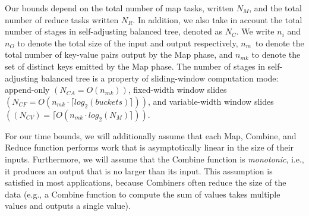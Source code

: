 \documentclass{article}
\newcommand{\ninput}{\ensuremath{n_i}\xspace}
\newcommand{\noutput}{\ensuremath{n_O}\xspace}
\newcommand{\nmap}{\ensuremath{N_M}\xspace}
\newcommand{\nred}{\ensuremath{N_R}\xspace}
\newcommand{\ncon}{\ensuremath{N_C}\xspace}
\newcommand{\nconAppend}{\ensuremath{N_{CA}}\xspace}
\newcommand{\nconFix}{\ensuremath{N_{CF}}\xspace}
\newcommand{\nconVariable}{\ensuremath{N_{CV}}\xspace}
\newcommand{\nkeysetmap}{\ensuremath{n_{mk}}}
\newcommand{\nkeyvaluemap}{\ensuremath{n_{m}}}
\begin{document}
Our bounds depend on the total number of map tasks, written
\nmap, and the total number of reduce tasks written \nred. In addition, we also
take in account the total number of stages in self-adjusting balanced tree,
denoted as \ncon. We write
\ninput and \noutput to denote the total size of the input and output
respectively, \nkeyvaluemap~to denote the total number of key-value
pairs output by the Map phase, and $\nkeysetmap$ to denote the set of
distinct keys emitted by the Map phase. The number of stages in self-adjusting
balanced tree is a property of sliding-window computation mode: append-only
$(\nconAppend  = O(\nkeysetmap))$, fixed-width window slides
$(\nconFix = O(\nkeysetmap \cdot \lceil log_2(buckets) \rceil)) $, and
variable-width window slides$((\nconVariable) = \lceil  O(\nkeysetmap \cdot
 log_2(\nmap) \rceil))$.








For our time bounds, we will additionally assume that each Map,
Combine, and Reduce function performs work that is asymptotically
linear in the size of their inputs.  Furthermore, we will assume that
the Combine function is {\em monotonic}, i.e., it produces an output
that is no larger than its input. This assumption is satisfied in
most applications, because Combiners often reduce the size of
the data (e.g., a Combine function to compute the sum of values takes
multiple values and outputs a single value).
\end{document}
